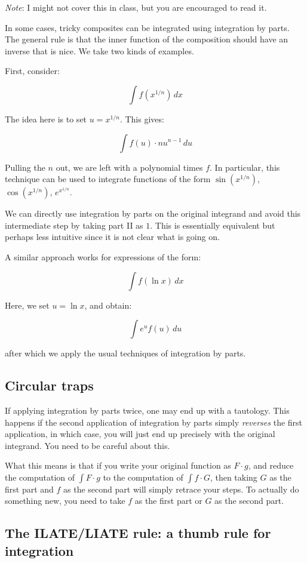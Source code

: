 \documentclass{amsart}
\begin{document}
{\em Note}: I might not cover this in class, but you are encouraged to
read it.

In some cases, tricky composites can be integrated using integration
by parts. The general rule is that the inner function of the
composition should have an inverse that is nice. We take two kinds of
examples.

First, consider:

$$\int f(x^{1/n}) \, dx$$

The idea here is to set $u = x^{1/n}$. This gives:

$$\int f(u) \cdot nu^{n-1} \, du$$

Pulling the $n$ out, we are left with a polynomial times $f$. In
particular, this technique can be used to integrate functions of the
form $\sin(x^{1/n})$, $\cos(x^{1/n})$, $e^{x^{1/n}}$.

We can directly use integration by parts on the original integrand and
avoid this intermediate step by taking part II as $1$. This is
essentially equivalent but perhaps less intuitive since it is not
clear what is going on.

A similar approach works for expressions of the form:

$$\int f(\ln x) \, dx$$

Here, we set $u = \ln x$, and obtain:

$$\int e^u f(u) \, du$$

after which we apply the usual techniques of integration by parts.

\subsection{Circular traps}

If applying integration by parts twice, one may end up with a
tautology. This happens if the second application of integration by
parts simply {\em reverses} the first application, in which case, you
will just end up precisely with the original integrand. You need to be
careful about this.

What this means is that if you write your original function as $F
\cdot g$, and reduce the computation of $\int F \cdot g$ to the
computation of $ \int f \cdot G$, then taking $G$ as the first part and $f$
as the second part will simply retrace your steps. To actually do
something new, you need to take $f$ as the first part or $G$ as the
second part.

\subsection{The ILATE/LIATE rule: a thumb rule for integration}
\end{document}
